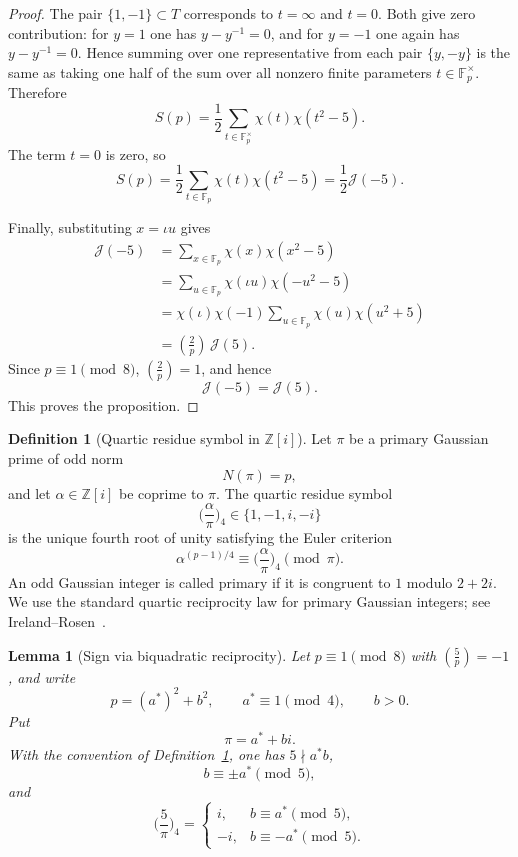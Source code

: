 \documentclass[11pt]{amsart}
\theoremstyle{plain}
\newtheorem{lemma}[theorem]{Lemma}
\theoremstyle{definition}
\newtheorem{definition}[theorem]{Definition}
\newcommand{\leg}[2]{\left(\frac{#1}{#2}\right)}
\newcommand{\Jac}{\mathcal{J}}
\begin{document}
\begin{proof}
The pair $\{1,-1\}\subset T$ corresponds to $t=\infty$ and $t=0$.
Both give zero contribution: for $y=1$ one has $y-y^{-1}=0$, and for
$y=-1$ one again has $y-y^{-1}=0$. Hence summing over one representative
from each pair $\{y,-y\}$ is the same as taking one half of the sum over
all nonzero finite parameters $t\in\mathbb F_p^\times$. Therefore
\[
  S(p)
  =
  \frac12\sum_{t\in\mathbb F_p^\times}
  \chi(t)\chi(t^2-5).
\]
The term $t=0$ is zero, so
\[
  S(p)
  =
  \frac12\sum_{t\in\mathbb F_p}
  \chi(t)\chi(t^2-5)
  =
  \frac12\Jac(-5).
\]

Finally, substituting $x=\iota u$ gives
\[
\begin{aligned}
 \Jac(-5)
 &= \sum_{x\in\mathbb F_p}\chi(x)\chi(x^2-5)\\
 &= \sum_{u\in\mathbb F_p}\chi(\iota u)\chi(-u^2-5)\\
 &= \chi(\iota)\chi(-1)
    \sum_{u\in\mathbb F_p}\chi(u)\chi(u^2+5)\\
 &= \leg2p\,\Jac(5).
\end{aligned}
\]
Since $p\equiv1\pmod8$, $\leg2p=1$, and hence
\[
  \Jac(-5)=\Jac(5).
\]
This proves the proposition.
\end{proof}

\begin{definition}[{Quartic residue symbol in $\mathbb Z[i]$}]\label{def:quartic-symbol}
Let $\pi$ be a primary Gaussian prime of odd norm
\[
  N(\pi)=p,
\]
and let $\alpha\in\mathbb Z[i]$ be coprime to $\pi$.
The quartic residue symbol
\[
  \biggl(\frac{\alpha}{\pi}\biggr)_{\!4}\in\{1,-1,i,-i\}
\]
is the unique fourth root of unity satisfying the Euler criterion
\[
  \alpha^{(p-1)/4}
  \equiv
  \biggl(\frac{\alpha}{\pi}\biggr)_{\!4}
  \pmod{\pi}.
\]
An odd Gaussian integer is called primary if it is congruent to $1$
modulo $2+2i$. We use the standard quartic reciprocity law for
primary Gaussian integers; see
Ireland--Rosen~\cite[Chapter~9, §§8--9, pp.~121--126]{IR}.
\end{definition}

\begin{lemma}[Sign via biquadratic reciprocity]\label{lem:sign5}
Let $p\equiv1\pmod8$ with $\leg5p=-1$, and write
\[
  p=(a^{*})^2+b^2,
  \qquad
  a^{*}\equiv1\pmod4,\qquad b>0.
\]
Put
\[
  \pi=a^{*}+bi.
\]
With the convention of Definition~\ref{def:quartic-symbol}, one has
$5\nmid a^{*}b$,
\[
  b\equiv\pm a^{*}\pmod5,
\]
and
\[
  \biggl(\frac{5}{\pi}\biggr)_{\!4}
  =
  \begin{cases}
    i,  & b\equiv a^{*}\pmod5,\\
    -i, & b\equiv -a^{*}\pmod5.
  \end{cases}
\]
\end{lemma}
\end{document}
